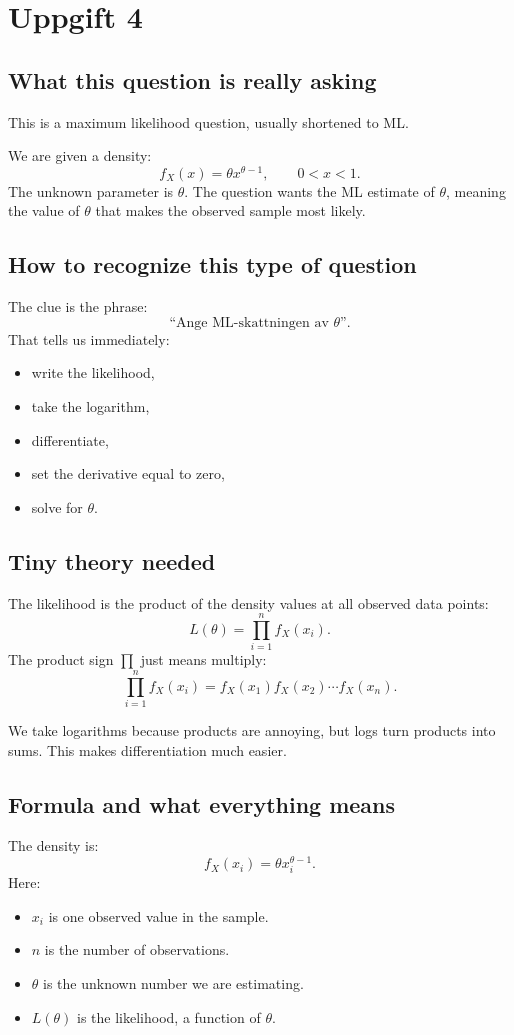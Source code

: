 \documentclass[11pt,a4paper]{article}
\begin{document}
\section*{Uppgift 4}

\subsection*{What this question is really asking}
This is a maximum likelihood question, usually shortened to ML.

We are given a density:
\[
f_X(x)=\theta x^{\theta-1},\qquad 0<x<1.
\]
The unknown parameter is \(\theta\). The question wants the ML estimate of \(\theta\), meaning the value of \(\theta\) that makes the observed sample most likely.

\subsection*{How to recognize this type of question}
The clue is the phrase:
\[
\text{``Ange ML-skattningen av \(\theta\)''}.
\]
That tells us immediately:
\begin{itemize}[leftmargin=*]
    \item write the likelihood,
    \item take the logarithm,
    \item differentiate,
    \item set the derivative equal to zero,
    \item solve for \(\theta\).
\end{itemize}

\subsection*{Tiny theory needed}
The likelihood is the product of the density values at all observed data points:
\[
L(\theta)=\prod_{i=1}^n f_X(x_i).
\]
The product sign \(\prod\) just means multiply:
\[
\prod_{i=1}^n f_X(x_i)=f_X(x_1)f_X(x_2)\cdots f_X(x_n).
\]

We take logarithms because products are annoying, but logs turn products into sums. This makes differentiation much easier.

\subsection*{Formula and what everything means}
The density is:
\[
f_X(x_i)=\theta x_i^{\theta-1}.
\]
Here:
\begin{itemize}[leftmargin=*]
    \item \(x_i\) is one observed value in the sample.
    \item \(n\) is the number of observations.
    \item \(\theta\) is the unknown number we are estimating.
    \item \(L(\theta)\) is the likelihood, a function of \(\theta\).
\end{itemize}
\end{document}
